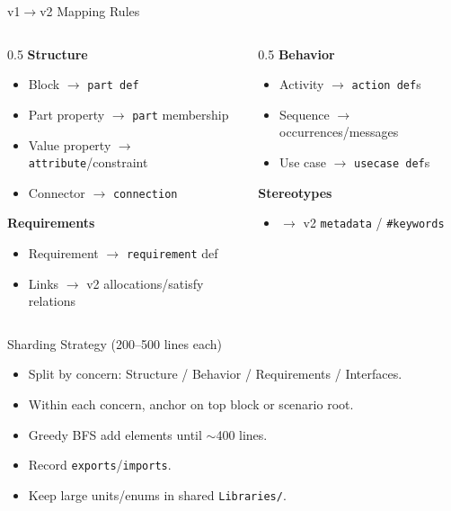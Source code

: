 \documentclass[aspectratio=169]{beamer}
\begin{document}
\begin{frame}{v1$\rightarrow$v2 Mapping Rules}
\begin{columns}[T]
\begin{column}{0.5\linewidth}
\textbf{Structure}
\begin{itemize}
  \item Block $\rightarrow$ \texttt{part def}
  \item Part property $\rightarrow$ \texttt{part} membership
  \item Value property $\rightarrow$ \texttt{attribute}/constraint
  \item Connector $\rightarrow$ \texttt{connection}
\end{itemize}
\textbf{Requirements}
\begin{itemize}
  \item Requirement $\rightarrow$ \texttt{requirement} def
  \item Links $\rightarrow$ v2 allocations/satisfy relations
\end{itemize}
\end{column}
\begin{column}{0.5\linewidth}
\textbf{Behavior}
\begin{itemize}
  \item Activity $\rightarrow$ \texttt{action def}s
  \item Sequence $\rightarrow$ occurrences/messages
  \item Use case $\rightarrow$ \texttt{usecase def}s
\end{itemize}
\textbf{Stereotypes}
\begin{itemize}
  \item $\rightarrow$ v2 \texttt{metadata} / \texttt{\#keywords}
\end{itemize}
\end{column}
\end{columns}
\end{frame}

\begin{frame}{Sharding Strategy (200--500 lines each)}
\begin{itemize}
  \item Split by concern: Structure / Behavior / Requirements / Interfaces.
  \item Within each concern, anchor on top block or scenario root.
  \item Greedy BFS add elements until $\sim$400 lines.
  \item Record \texttt{exports}/\texttt{imports}.
  \item Keep large units/enums in shared \texttt{Libraries/}.
\end{itemize}
\end{frame}
\end{document}
